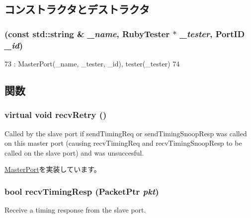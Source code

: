 \subsection{コンストラクタとデストラクタ}
\hypertarget{classRubyTester_1_1CpuPort_ab42430e504c30ece2d58208d525c99de}{
\subsubsection[{CpuPort}]{ (const std::string \& {\em \_\-name}, \/  {\bf RubyTester} $\ast$ {\em \_\-tester}, \/  {\bf PortID} {\em \_\-id})}}
\label{classRubyTester_1_1CpuPort_ab42430e504c30ece2d58208d525c99de}



\begin{DoxyCode}
73             : MasterPort(_name, _tester, _id), tester(_tester)
74         {}
\end{DoxyCode}


\subsection{関数}
\hypertarget{classRubyTester_1_1CpuPort_a7ec461ad187b82b4b21e27c86e45cf9c}{
\subsubsection[{recvRetry}]{\setlength{\rightskip}{0pt plus 5cm}virtual void recvRetry ()}}
\label{classRubyTester_1_1CpuPort_a7ec461ad187b82b4b21e27c86e45cf9c}
Called by the slave port if sendTimingReq or sendTimingSnoopResp was called on this master port (causing recvTimingReq and recvTimingSnoopResp to be called on the slave port) and was unsuccesful. 

\hyperlink{classMasterPort_ac1ccc3bcf7ebabb20b57fab99b2be5b0}{MasterPort}を実装しています。


\hypertarget{classRubyTester_1_1CpuPort_a482dba5588f4bee43e498875a61e5e0b}{
\subsubsection[{recvTimingResp}]{\setlength{\rightskip}{0pt plus 5cm}bool recvTimingResp ({\bf PacketPtr} {\em pkt})}}
\label{classRubyTester_1_1CpuPort_a482dba5588f4bee43e498875a61e5e0b}
Receive a timing response from the slave port. 

